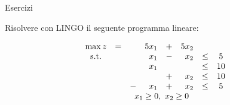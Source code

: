 \documentclass{beamer}
\begin{document}
\generatitolo

\def\rombo{$$
\begin{array}{cccrcrcc}
	\max z	&=	& 	&5 x_{1}	&+&5 x_{2}\\
	\mbox{s.t.}	&	& & x_{1}	&-& x_{2}	&\leq	& 5\\
				&	& & x_{1}	& &     	&\leq	&10\\
				&	& &			&+& x_{2}	&\leq	&10\\
				&	&-& x_{1}	&+& x_{2}	&\leq	& 5\\
	&	&\multicolumn{4}{c}{x_{1} \geq 0,\ x_{2}\geq 0}
\end{array}
$$}

\begin{frame}%
{Esercizi}

Risolvere con LINGO il seguente programma lineare:

\begin{enumerate}
{\footnotesize \item \rombo}
\end{enumerate}

\end{frame}
\end{document}
